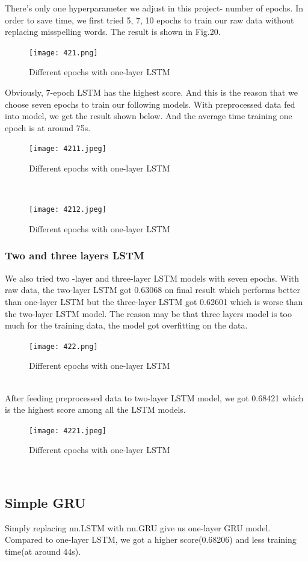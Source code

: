 \documentclass{article}
\begin{document}
\noindent There’s only one hyperparameter we adjust in this project- number of epochs. In order to save time, we first tried 5, 7, 10 epochs to train our raw data without replacing misspelling words. The result is shown in Fig.20.\\
\begin{figure}[h]
	\centering
	\texttt{[image: 421.png]}
	\caption{Different epochs with one-layer LSTM}
\end{figure}
\noindent Obviously, 7-epoch LSTM has the highest score. And this is the reason that we choose seven epochs to train our following models.
With preprocessed data fed into model, we get the result shown below. And the average time training one epoch is at around 75s.
\begin{figure}[h]
	\centering
	\texttt{[image: 4211.jpeg]}
	\caption{Different epochs with one-layer LSTM}
\end{figure}\\
\begin{figure}[h]
	\centering
	\texttt{[image: 4212.jpeg]}
	\caption{Different epochs with one-layer LSTM}
\end{figure}
\subsubsection{ Two and three layers LSTM}
\noindent We also tried two -layer and three-layer LSTM models with seven epochs. With raw data, the two-layer LSTM got 0.63068 on final result which performs better than one-layer LSTM but the three-layer LSTM got 0.62601 which is worse than the two-layer LSTM model. The reason may be that three layers model is too much for the training data, the model got overfitting on the data.\\
\begin{figure}[h]
	\centering
	\texttt{[image: 422.png]}
	\caption{Different epochs with one-layer LSTM}
\end{figure}\\
\noindent After feeding preprocessed data to two-layer LSTM model, we got 0.68421 which is the highest score among all the LSTM models.\\
	\begin{figure}[h]
		\centering
		\texttt{[image: 4221.jpeg]}
		\caption{Different epochs with one-layer LSTM}
	\end{figure}\\
\subsection{Simple GRU}
\noindent Simply replacing nn.LSTM with nn.GRU give us one-layer GRU model. Compared to one-layer LSTM, we got a higher score(0.68206) and less training time(at around 44s).\\
\end{document}
